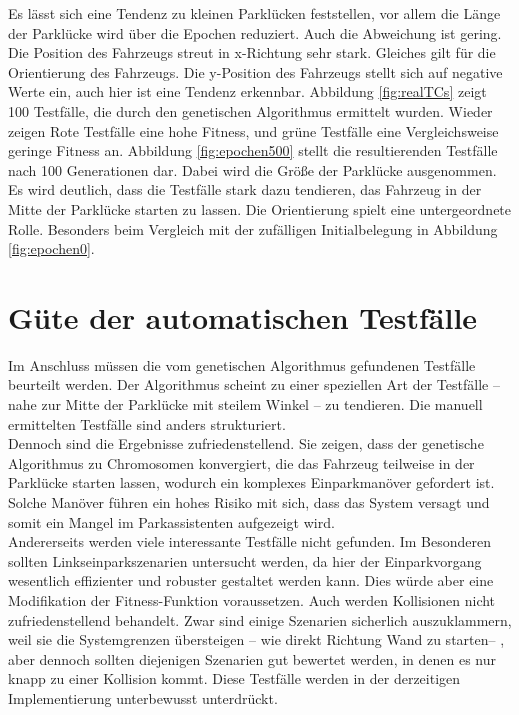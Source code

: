 \documentclass[12pt,a4paper]{article}
\begin{document}
Es lässt sich eine Tendenz zu kleinen Parklücken feststellen, vor allem die Länge der Parklücke wird über die Epochen reduziert. Auch die Abweichung ist gering. Die Position des Fahrzeugs streut in x-Richtung sehr stark. Gleiches gilt für die Orientierung des Fahrzeugs. Die y-Position des Fahrzeugs stellt sich auf negative Werte ein, auch hier ist eine Tendenz erkennbar. Abbildung \ref{fig:realTCs} zeigt 100 Testfälle, die durch den genetischen Algorithmus ermittelt wurden. Wieder zeigen Rote Testfälle eine hohe Fitness, und grüne Testfälle eine Vergleichsweise geringe Fitness an. Abbildung \ref{fig:epochen500} stellt die resultierenden Testfälle nach 100 Generationen dar. Dabei wird die Größe der Parklücke ausgenommen. Es wird deutlich, dass die Testfälle stark dazu tendieren, das Fahrzeug in der Mitte der Parklücke starten zu lassen. Die Orientierung spielt eine untergeordnete Rolle. Besonders beim Vergleich mit der zufälligen Initialbelegung in Abbildung \ref{fig:epochen0}.

\section{Güte der automatischen Testfälle}
Im Anschluss müssen die vom genetischen Algorithmus gefundenen Testfälle beurteilt werden. Der Algorithmus scheint zu einer speziellen Art der Testfälle -- nahe zur Mitte der Parklücke mit steilem Winkel -- zu tendieren. Die manuell ermittelten Testfälle sind anders strukturiert.\\
Dennoch sind die Ergebnisse zufriedenstellend. Sie zeigen, dass der genetische Algorithmus zu Chromosomen konvergiert, die das Fahrzeug teilweise in der Parklücke starten lassen, wodurch ein komplexes Einparkmanöver gefordert ist. Solche Manöver führen ein hohes Risiko mit sich, dass das System versagt und somit ein Mangel im Parkassistenten aufgezeigt wird.\\
Andererseits werden viele interessante Testfälle nicht gefunden. Im Besonderen sollten Linkseinparkszenarien untersucht werden, da hier der Einparkvorgang wesentlich effizienter und robuster gestaltet werden kann. Dies würde aber eine Modifikation der Fitness-Funktion voraussetzen. Auch werden Kollisionen nicht zufriedenstellend behandelt. Zwar sind einige Szenarien sicherlich auszuklammern, weil sie die Systemgrenzen übersteigen -- wie direkt Richtung Wand zu starten-- , aber dennoch sollten diejenigen Szenarien gut bewertet werden, in denen es nur knapp zu einer Kollision kommt. Diese Testfälle werden in der derzeitigen Implementierung unterbewusst unterdrückt.
\end{document}
